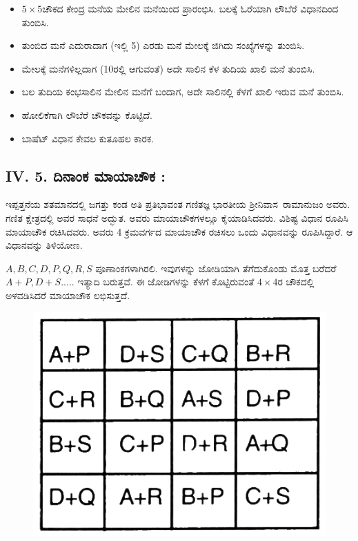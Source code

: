 \begin{itemize}
	\item $5 \times 5$ಚೌಕದ ಕೇಂದ್ರ ಮನೆಯ ಮೇಲಿನ ಮನೆಯಿಂದ ಪ್ರಾರಂಭಿಸಿ. ಬಲಕ್ಕೆ ಓರೆಯಾಗಿ ಲೌಬೆರೆ ವಿಧಾನದಿಂದ ತುಂಬಿಸಿ.
	\item ತುಂಬಿದ ಮನೆ ಎದುರಾದಾಗ (ಇಲ್ಲಿ 5) ಎರಡು ಮನೆ ಮೇಲಕ್ಕೆ ಜಿಗಿದು ಸಂಖ್ಯೆಗಳನ್ನು ತುಂಬಿಸಿ.
	\item ಮೇಲಕ್ಕೆ ಮನೆಗಳಿಲ್ಲದಾಗ (10ರಲ್ಲಿ ಆಗುವಂತೆ) ಅದೇ ಸಾಲಿನ ಕೆಳ ತುದಿಯ ಖಾಲಿ ಮನೆ ತುಂಬಿಸಿ.
	\item ಬಲ ತುದಿಯ ಕಂಭಸಾಲಿನ ಮೇಲಿನ ಮನೆಗೆ ಬಂದಾಗ, ಅದೇ ಸಾಲಿನಲ್ಲಿ ಕೆಳಗೆ \break ಖಾಲಿ ಇರುವ ಮನೆ ತುಂಬಿಸಿ.
	\item ಹೋಲಿಕೆಗಾಗಿ ಲೌಬೆರೆ ಚೌಕವನ್ನು ಕೊಟ್ಟಿದೆ.
	\item ಬಾಷೆಟ್ ವಿಧಾನ ಕೇವಲ ಕುತೂಹಲ ಕಾರಕ.
\end{itemize}

\subsection*{IV. 5. ದಿನಾಂಕ ಮಾಯಾಚೌಕ :}

ಇಪ್ಪತ್ತನೆಯ ಶತಮಾನದಲ್ಲಿ ಜಗತ್ತು ಕಂಡ ಅತಿ ಪ್ರತಿಭಾವಂತ ಗಣಿತಜ್ಞ ಭಾರತೀಯ \hbox{ಶ್ರೀನಿವಾಸ ರಾಮಾನುಜಂ} ಅವರು. ಗಣಿತ ಕ್ಷೇತ್ರದಲ್ಲಿ ಅವರ ಸಾಧನೆ ಅದ್ಭುತ. ಅವರು ಮಾಯಾ\-ಚೌಕಗಳಲ್ಲೂ ಕೈಯಾಡಿಸಿದವರು. ವಿಶಿಷ್ಟ ವಿಧಾನ ರೂಪಿಸಿ ಮಾಯಾಚೌಕ ರಚಿಸಿ\-ದವರು. ಅವರು 4 ಕ್ರಮವರ್ಗದ ಮಾಯಾಚೌಕ ರಚಿಸಲು ಒಂದು ವಿಧಾನವನ್ನು ರೂಪಿಸಿದ್ದಾರೆ. ಆ ವಿಧಾನವನ್ನು ತಿಳಿಯೋಣ.

$A, B, C, D, P, Q, R, S$ ಪೂಣಾಂಕಗಳಾಗಿರಲಿ. ಇವುಗಳನ್ನು ಜೋಡಿಯಾಗಿ ತೆಗೆದು\-ಕೊಂಡು ಮೊತ್ತ ಬರೆದರೆ $A+P, D+S.....$ ಇತ್ಯಾದಿ ಬರುತ್ತವೆ. ಈ ಜೋಡಿಗಳನ್ನು ಕೆಳಗೆ ಕೊಟ್ಟಿರುವಂತೆ $4 \times 4$ರ ಚೌಕದಲ್ಲಿ ಅಳವಡಿಸಿದರೆ ಮಾಯಾಚೌಕ ಲಭಿಸುತ್ತದೆ.

\begin{figure}[H]
\includegraphics{src/figures/chap3/fig3-44.jpg}
\end{figure}


